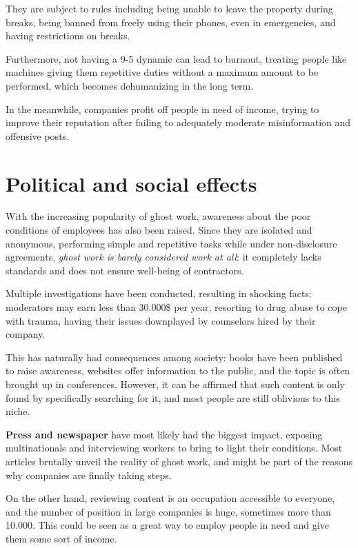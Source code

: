 \documentclass[12pt]{article}
\begin{document}
	They are subject to rules including being unable to leave the property during breaks, being banned from freely using their phones, even in emergencies, and having restrictions on breaks.\cite{bi}
	
	Furthermore, not having a 9-5 dynamic can lead to burnout, treating people like machines giving them repetitive duties without a maximum amount to be performed, which becomes dehumanizing in the long term. 
	
	In the meanwhile, companies profit off people in need of income, trying to improve their reputation after failing to adequately moderate misinformation and offensive posts. 
	
	\section{Political and social effects}
	With the increasing popularity of ghost work, awareness about the poor conditions of employees has also been raised. Since they are isolated and anonymous, performing simple and repetitive tasks while under non-disclosure agreements, \textit{ghost work is barely considered work at all}: it completely lacks standards and does not ensure well-being of contractors. 
	
	Multiple investigations have been conducted, resulting in shocking facts: moderators may earn less than 30.000\$ per year\cite{theverge}, resorting to drug abuse to cope with trauma, having their issues downplayed by counselors hired by their company.
	
	This has naturally had consequences among society: books have been published to raise awareness, websites offer information to the public, and the topic is often brought up in conferences. However, it can be affirmed that such content is only found by specifically searching for it, and most people are still oblivious to this niche.
	
	\textbf{Press and newspaper} have most likely had the biggest impact, exposing multinationals and interviewing workers to bring to light their conditions. Most articles brutally unveil the reality of ghost work, and might be part of the reasons why companies are finally taking steps.
	
	On the other hand, reviewing content is an occupation accessible to everyone, and the number of position in large companies is huge, sometimes more than 10.000\cite{washington}. This could be seen as a great way to employ people in need and give them some sort of income. 
	
\end{document}
